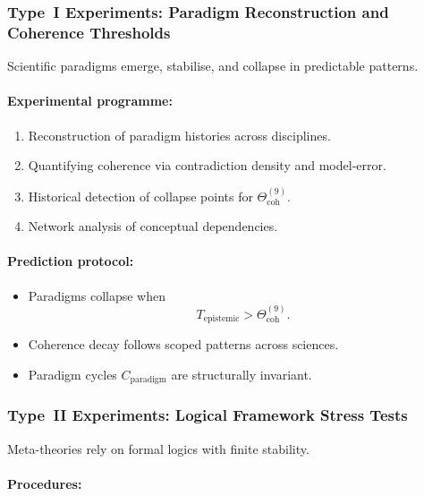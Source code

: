 \subsubsection{Type~I Experiments: Paradigm Reconstruction and Coherence Thresholds}

Scientific paradigms emerge, stabilise, and collapse in 
predictable patterns.

\paragraph{Experimental programme:}

\begin{enumerate}
    \item Reconstruction of paradigm histories across disciplines.
    \item Quantifying coherence via contradiction density and model-error.
    \item Historical detection of collapse points for 
          $\Theta_{\mathrm{coh}}^{(9)}$.
    \item Network analysis of conceptual dependencies.
\end{enumerate}

\paragraph{Prediction protocol:}

\begin{itemize}
    \item Paradigms collapse when 
          \[
              T_{\mathrm{epistemic}} > \Theta_{\mathrm{coh}}^{(9)}.
          \]
    \item Coherence decay follows scoped patterns across sciences.
    \item Paradigm cycles $C_{\mathrm{paradigm}}$ are structurally invariant.
\end{itemize}



\subsubsection{Type~II Experiments: Logical Framework Stress Tests}

Meta-theories rely on formal logics with finite stability.

\paragraph{Procedures:}

